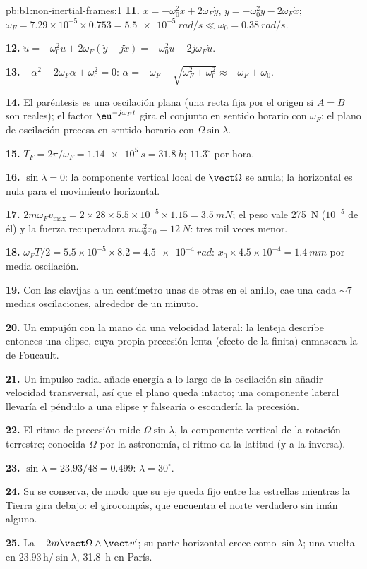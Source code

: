 \begin{solution}{pb:b1:non-inertial-frames:1}
\textbf{11.} $\ddot x = -\omega_0^2x + 2\omega_F\dot y$, $\ddot y = -\omega_0^2y -
2\omega_F\dot x$; $\omega_F = 7.29\times10^{-5} \times 0.753 = \qty{5.5e-5}{rad/s}
\ll \omega_0 = \qty{0.38}{rad/s}$.

\textbf{12.} $\ddot u = -\omega_0^2u + 2\omega_F(\dot y - j\dot x) = -\omega_0^2u -
2j\omega_F\dot u$.

\textbf{13.} $-\alpha^2 - 2\omega_F\alpha + \omega_0^2 = 0$: $\alpha = -\omega_F \pm
\sqrt{\omega_F^2 + \omega_0^2} \approx -\omega_F \pm \omega_0$.

\textbf{14.} El paréntesis es una oscilación plana (una recta fija por el
origen si $A = B$ son reales); el factor $\eu^{-j\omega_Ft}$ gira el conjunto
en sentido horario con $\omega_F$: el plano de oscilación precesa en sentido
horario con $\Omega\sin\lambda$.

\textbf{15.} $T_F = 2\pi/\omega_F = \qty{1.14e5}{s} = \qty{31.8}{h}$; $11.3^\circ$
por hora.

\textbf{16.} $\sin\lambda = 0$: la componente vertical local de $\vect\Omega$
se anula; la  horizontal es nula para el movimiento horizontal.

\textbf{17.} $2m\omega_Fv_{\max} = 2 \times 28 \times 5.5\times10^{-5} \times 1.15 =
\qty{3.5}{mN}$; el peso vale \qty{275}{N} ($10^{-5}$ de él) y la fuerza
recuperadora $m\omega_0^2x_0 = \qty{12}{N}$: tres mil veces menor.

\textbf{18.} $\omega_FT/2 = 5.5\times10^{-5} \times 8.2 = \qty{4.5e-4}{rad}$:
$x_0 \times 4.5\times10^{-4} = \qty{1.4}{mm}$ por media oscilación.

\textbf{19.} Con las clavijas a un centímetro unas de otras en el anillo,
cae una cada $\sim 7$ medias oscilaciones, alrededor de un minuto.

\textbf{20.} Un empujón con la mano da una velocidad lateral: la lenteja
describe entonces una elipse, cuya propia precesión lenta (efecto de la
 finita) enmascara la de Foucault.

\textbf{21.} Un impulso radial añade energía a lo largo de la oscilación
sin añadir velocidad transversal, así que el plano queda intacto; una
componente lateral llevaría el péndulo a una elipse y falsearía o
escondería la precesión.

\textbf{22.} El ritmo de precesión mide $\Omega\sin\lambda$, la componente
vertical de la rotación terrestre; conocida $\Omega$ por la astronomía, el
ritmo da la latitud (y a la inversa).

\textbf{23.} $\sin\lambda = 23.93/48 = 0.499$: $\lambda = 30^\circ$.

\textbf{24.} Su  se conserva, de modo que su eje queda fijo
entre las estrellas mientras la Tierra gira debajo: el girocompás, que
encuentra el norte verdadero sin imán alguno.

\textbf{25.} La  $-2m\vect\Omega\wedge\vect v'$; su parte
horizontal crece como $\sin\lambda$; una vuelta en $23.93\,\text{h}/\sin\lambda$,
\qty{31.8}{h} en París.
\end{solution}
